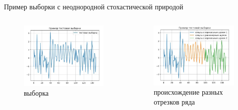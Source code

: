 \documentclass{beamer}
\begin{document}
\begin{frame}{Пример выборки с неоднородной стохастической природой}

\begin{columns}[c]
\begin{figure}
\includegraphics[width=1.0\textwidth]{sample_1.jpg}
    \caption{выборка}
\end{figure}
\begin{figure}
\includegraphics[width=1.0\textwidth]{sample_2.jpg}
    \caption{происхождение разных отрезков ряда}
    \end{figure}
\end{columns}

\end{frame}
\end{document}
